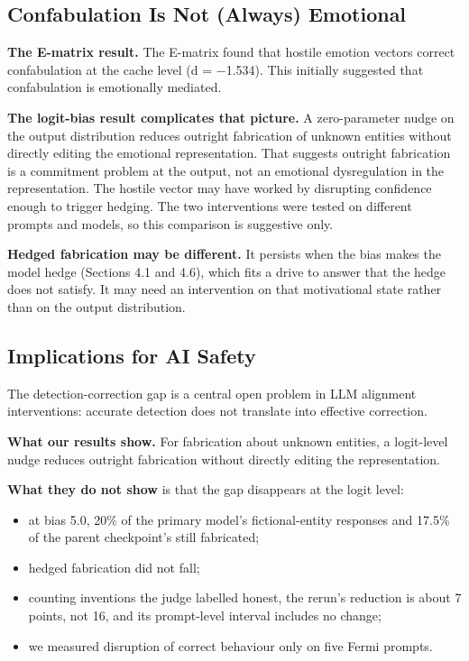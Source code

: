 \documentclass[11pt,letterpaper]{article}
\providecommand{\tightlist}{\setlength{\itemsep}{0pt}\setlength{\parskip}{0pt}}
\DeclareRobustCommand{\_}{\textunderscore\allowbreak}
\begin{document}
\hypertarget{confabulation-is-not-always-emotional}{%
\subsection{Confabulation Is Not (Always) Emotional}\label{confabulation-is-not-always-emotional}}

\textbf{The E-matrix result.} The E-matrix \cite{edrington2026oracle} found that hostile emotion vectors correct confabulation at the cache level (d = \(-\)1.534). This initially suggested that confabulation is emotionally mediated.

\textbf{The logit-bias result complicates that picture.} A zero-parameter nudge on the output distribution reduces outright fabrication of unknown entities without directly editing the emotional representation. That suggests outright fabrication is a commitment problem at the output, not an emotional dysregulation in the representation. The hostile vector may have worked by disrupting confidence enough to trigger hedging. The two interventions were tested on different prompts and models, so this comparison is suggestive only.

\textbf{Hedged fabrication may be different.} It persists when the bias makes the model hedge (Sections 4.1 and 4.6), which fits a drive to answer that the hedge does not satisfy. It may need an intervention on that motivational state rather than on the output distribution.

\hypertarget{implications-for-ai-safety}{%
\subsection{Implications for AI Safety}\label{implications-for-ai-safety}}

The detection-correction gap is a central open problem in LLM alignment interventions: accurate detection does not translate into effective correction.

\textbf{What our results show.} For fabrication about unknown entities, a logit-level nudge reduces outright fabrication without directly editing the representation.

\textbf{What they do not show} is that the gap disappears at the logit level:

\begin{itemize}
\tightlist
\item
  at bias 5.0, 20\% of the primary model's fictional-entity responses and 17.5\% of the parent checkpoint's still fabricated;
\item
  hedged fabrication did not fall;
\item
  counting inventions the judge labelled honest, the rerun's reduction is about 7 points, not 16, and its prompt-level interval includes no change;
\item
  we measured disruption of correct behaviour only on five Fermi prompts.
\end{itemize}
\end{document}

